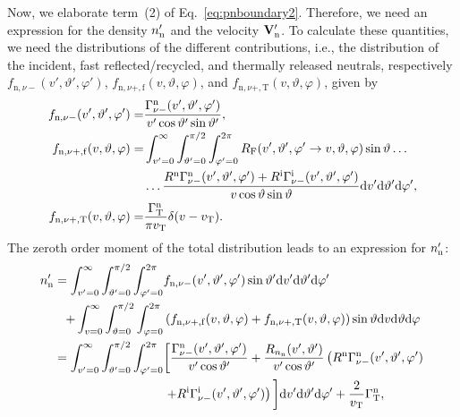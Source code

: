 Now, we elaborate term~(2) of Eq.~\eqref{eq:pnboundary2}. Therefore, we need an expression for the density $n_{\mathrm{n}}'$ and the velocity ${\bf V}_{\mathrm{n}}'$. To calculate these quantities, we need the distributions of the different contributions, i.e., the distribution of the incident, fast reflected/recycled, and thermally released neutrals, respectively $f_{\mathrm{n},\nu-}(v',\vartheta',\varphi')$, $f_{\mathrm{n},\nu+,\mathrm{f}}(v,\vartheta,\varphi)$, and $f_{\mathrm{n},\nu+,\mathrm{T}}(v,\vartheta,\varphi)$, given by
\begin{align}
f_{\mathrm{n},\nu-}(v',\vartheta',\varphi') =& \frac{\Gamma_{\nu-}^{\mathrm{n}}(v',\vartheta',\varphi')}{v'\cos \vartheta' \sin \vartheta'}, \\
f_{\mathrm{n},\nu+,\mathrm{f}}(v,\vartheta,\varphi) =& \int_{v'=0}^{\infty} \int_{\vartheta'=0}^{\pi/2} \int_{\varphi'=0}^{2\pi} R_{\mathrm{F}}(v',\vartheta',\varphi' \rightarrow v,\vartheta,\varphi) \sin \vartheta \ldots \nonumber \\
&\ldots \frac{R^{\mathrm{n}} \Gamma_{\nu-}^{\mathrm{n}}(v',\vartheta',\varphi') + R^{\mathrm{i}} \Gamma_{\nu-}^{\mathrm{i}}(v',\vartheta',\varphi')}{v \cos \vartheta \sin \vartheta} \mathrm{d} v' \mathrm{d} \vartheta' \mathrm{d} \varphi', \label{eq:fnplusf} \\
f_{\mathrm{n},\nu+,\mathrm{T}}(v,\vartheta,\varphi) =& \frac{\Gamma_{\mathrm{T}}^{\mathrm{n}}}{\pi v_{\mathrm{T}}} \delta (v - v_{\mathrm{T}}).
\end{align}
The zeroth order moment of the total distribution leads to an expression for $n_{\mathrm{n}}'$:
\begin{align}
n_{\mathrm{n}}' = \int_{v'=0}^{\infty} \int_{\vartheta'=0}^{\pi/2} \int_{\varphi'=0}^{2\pi} &
f_{\mathrm{n},\nu-}(v',\vartheta',\varphi') \sin \vartheta' \mathrm{d} v' \mathrm{d} \vartheta' \mathrm{d} \varphi' \nonumber \\
+ \int_{v=0}^{\infty} \int_{\vartheta = 0}^{\pi/2} \int_{\varphi = 0}^{2\pi} & \left( f_{\mathrm{n},\nu+,\mathrm{f}}(v,\vartheta,\varphi) + f_{\mathrm{n},\nu+,\mathrm{T}}(v,\vartheta,\varphi) \right) \sin \vartheta \mathrm{d} v \mathrm{d} \vartheta \mathrm{d} \varphi \nonumber \\
= \int_{v'=0}^{\infty} \int_{\vartheta' = 0}^{\pi/2} \int_{\varphi' = 0}^{2\pi} & \bigg[ \frac{\Gamma_{\nu-}^{\mathrm{n}}(v',\vartheta',\varphi')}{v' \cos \vartheta'} + \frac{R_{n_{\mathrm{n}}}(v',\vartheta')}{v' \cos \vartheta'} \left( R^{\mathrm{n}} \Gamma_{\nu-}^{\mathrm{n}}(v',\vartheta',\varphi') \right. \nonumber \\
& \left. + R^{\mathrm{i}} \Gamma_{\nu-}^{\mathrm{i}}(v',\vartheta',\varphi') \right) \bigg] \mathrm{d} v' \mathrm{d} \vartheta' \mathrm{d} \varphi' + \frac{2}{v_{\mathrm{T}}} \Gamma_{\mathrm{T}}^{\mathrm{n}}, \label{eq:nnboundary}
\end{align}
